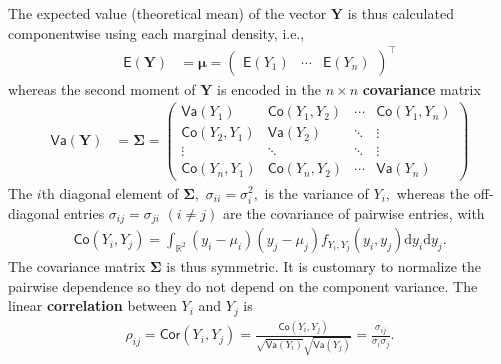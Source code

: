 \documentclass[
  11pt,
  letterpaper,
]{scrbook}
\theoremstyle{definition}
\theoremstyle{plain}
\theoremstyle{plain}
\theoremstyle{definition}
\theoremstyle{definition}
\theoremstyle{remark}
\begin{document}
The expected value (theoretical mean) of the vector \(\boldsymbol{Y}\)
is thus calculated componentwise using each marginal density, i.e.,
\begin{align*}
\mathsf{E}(\boldsymbol{Y}) &= \boldsymbol{\mu}=
\begin{pmatrix}
\mathsf{E}(Y_1) &
\cdots  &
\mathsf{E}(Y_n)
\end{pmatrix}^\top
\end{align*} whereas the second moment of \(\boldsymbol{Y}\) is encoded
in the \(n \times n\) \textbf{covariance} matrix \begin{align*}
\mathsf{Va}(\boldsymbol{Y}) &= \boldsymbol{\Sigma} = \begin{pmatrix} \mathsf{Va}(Y_1) & \mathsf{Co}(Y_1, Y_2)  & \cdots & \mathsf{Co}(Y_1, Y_n) \\
\mathsf{Co}(Y_2, Y_1) & \mathsf{Va}(Y_2) & \ddots & \vdots \\
\vdots & \ddots & \ddots & \vdots \\
\mathsf{Co}(Y_n, Y_1) & \mathsf{Co}(Y_n, Y_2) &\cdots & \mathsf{Va}(Y_n)
\end{pmatrix}
\end{align*} The \(i\)th diagonal element of \(\boldsymbol{\Sigma},\)
\(\sigma_{ii}=\sigma_i^2,\) is the variance of \(Y_i,\) whereas the
off-diagonal entries \(\sigma_{ij}=\sigma_{ji}\) \((i \neq j)\) are the
covariance of pairwise entries, with \begin{align*}
\mathsf{Co}(Y_i, Y_j) = \int_{\mathbb{R}^2} (y_i-\mu_i)(y_j-\mu_j) f_{Y_i, Y_j}(y_i, y_j) \mathrm{d} y_i \mathrm{d} y_j.
\end{align*} The covariance matrix \(\boldsymbol{\Sigma}\) is thus
symmetric. It is customary to normalize the pairwise dependence so they
do not depend on the component variance. The linear \textbf{correlation}
between \(Y_i\) and \(Y_j\) is \begin{align*}
\rho_{ij}=\mathsf{Cor}(Y_i,Y_j)=\frac{\mathsf{Co}(Y_i, Y_j)}{\sqrt{\mathsf{Va}(Y_i)}\sqrt{\mathsf{Va}(Y_j)}}=\frac{\sigma_{ij}}{\sigma_i\sigma_j}.
\end{align*}
\end{document}
